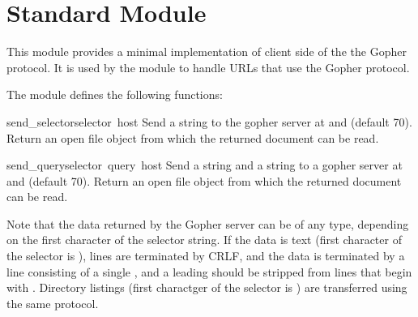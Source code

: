 \section{Standard Module }

\renewcommand{\indexsubitem}{(in module gopherlib)}

This module provides a minimal implementation of client side of the
the Gopher protocol.  It is used by the module  to handle
URLs that use the Gopher protocol.

The module defines the following functions:

\begin{funcdesc}{send_selector}{selector\, host}
Send a  string to the gopher server at  and
 (default 70).  Return an open file object from which the
returned document can be read.
\end{funcdesc}

\begin{funcdesc}{send_query}{selector\, query\, host}
Send a  string and a  string to a gopher
server at  and  (default 70).  Return an open file
object from which the returned document can be read.
\end{funcdesc}

Note that the data returned by the Gopher server can be of any type,
depending on the first character of the selector string.  If the data
is text (first character of the selector is ), lines are
terminated by CRLF, and the data is terminated by a line consisting of
a single , and a leading  should be stripped from
lines that begin with .  Directory listings (first charactger
of the selector is ) are transferred using the same protocol.
